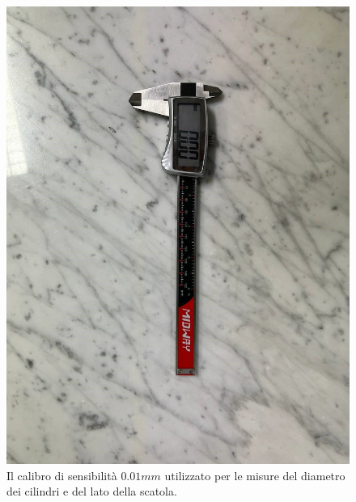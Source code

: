 \documentclass{article}
\begin{document}
\begin{figure}[ht!]
\begin{minipage}[t]{0.3\linewidth}
        \includegraphics[width=\linewidth]{images/calibro.jpg}
        \caption{Il calibro di sensibilità $0.01mm$ utilizzato per le misure del diametro dei cilindri e del lato della scatola.}
        \label{fig:calibro}
    \end{minipage}\hfill
    \begin{minipage}[t]{0.3\linewidth}

\end{minipage}
\end{figure}
\end{document}
